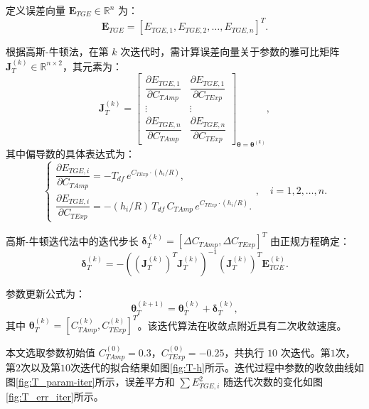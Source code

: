 定义误差向量 $\boldsymbol{E}_{TGE} \in \mathbb{R}^{n}$ 为：
\begin{equation}
    \boldsymbol{E}_{TGE} = [E_{TGE,1}, E_{TGE,2}, \dots, E_{TGE,n}]^{T}.
\end{equation}

根据高斯-牛顿法，在第 $k$ 次迭代时，需计算误差向量关于参数的雅可比矩阵 $\boldsymbol{J}_T^{(k)} \in \mathbb{R}^{n \times 2}$，其元素为：
\begin{equation}
    \boldsymbol{J}_T^{(k)} = 
    \begin{bmatrix}
        \dfrac{\partial E_{TGE,1}}{\partial C_{TAmp}} & \dfrac{\partial E_{TGE,1}}{\partial C_{TExp}} \\[6pt]
        \vdots & \vdots \\[6pt]
        \dfrac{\partial E_{TGE,n}}{\partial C_{TAmp}} & \dfrac{\partial E_{TGE,n}}{\partial C_{TExp}}
    \end{bmatrix}_{\boldsymbol{\theta}=\boldsymbol{\theta}^{(k)}},
\end{equation}
其中偏导数的具体表达式为：
\begin{equation}
    \begin{cases}
        \dfrac{\partial E_{TGE,i}}{\partial C_{TAmp}} = -T_{df} \, e^{C_{TExp} \cdot (h_i/R)},\\[8pt]
        \dfrac{\partial E_{TGE,i}}{\partial C_{TExp}} = - (h_i/R)\, T_{df}\, C_{TAmp} \, e^{C_{TExp} \cdot (h_i/R)}.
    \end{cases}
    ,\quad i = 1,2,\dots,n.
\end{equation}

高斯-牛顿迭代法中的迭代步长 $\boldsymbol{\delta}_T^{(k)} = [\Delta C_{TAmp}, \Delta C_{TExp}]^{T}$ 由正规方程确定：
\begin{equation}
    \boldsymbol{\delta}_T^{(k)} = -\left( (\boldsymbol{J}_T^{(k)})^{T} \boldsymbol{J}_T^{(k)} \right)^{-1} (\boldsymbol{J}_T^{(k)})^{T} \boldsymbol{E}_{TGE}^{(k)}.
\end{equation}

参数更新公式为：
\begin{equation}
    \boldsymbol{\theta}_T^{(k+1)} = \boldsymbol{\theta}_T^{(k)} + \boldsymbol{\delta}_T^{(k)},
\end{equation}
其中 $\boldsymbol{\theta}_T^{(k)} = [C_{TAmp}^{(k)}, C_{TExp}^{(k)}]^{T}$。该迭代算法在收敛点附近具有二次收敛速度。

本文选取参数初始值 $C_{TAmp}^{(0)} = 0.3$，$C_{TExp}^{(0)} = -0.25$，共执行 $10$ 次迭代。第$1$次，第$2$次以及第$10$次迭代的拟合结果如图\ref{fig:T-h}所示。迭代过程中参数的收敛曲线如图\ref{fig:T_param-iter}所示，误差平方和 $\sum E_{TGE,i}^2$ 随迭代次数的变化如图\ref{fig:T_err_iter}所示。


